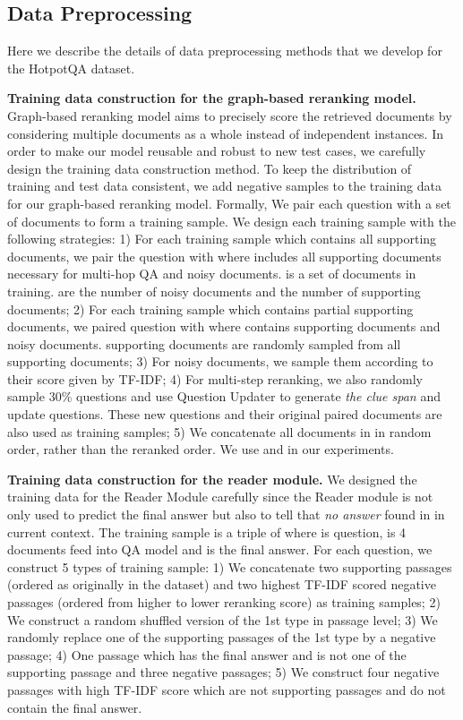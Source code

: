 \documentclass[sigconf]{acmart}
\begin{document}
\subsection{Data Preprocessing}

Here we describe the details of data preprocessing methods that we develop for the HotpotQA dataset.

\BlankLine
\noindent \textbf{Training data construction for the graph-based reranking model.}
Graph-based reranking model aims to precisely score the retrieved documents by considering multiple documents as a whole instead of independent instances. In order to make our model reusable and robust to new test cases, we carefully design the training data construction method. To keep the distribution of training and test data consistent, we add negative samples to the training data for our graph-based reranking model. Formally, We pair each question  with a set of documents  to form a training sample. We design each training sample with the following strategies: 1) For each training sample which contains all supporting documents, we pair the question  with  where  includes all  supporting documents necessary for multi-hop QA and  noisy documents.  is a set of documents in training.  are the number of noisy documents and the number of supporting documents; 2) For each training sample which contains partial supporting documents, we paired question  with  where  contains  supporting documents and  noisy documents. supporting documents are randomly sampled from all supporting documents; 3) For noisy documents, we sample them according to their score given by TF-IDF; 4) For multi-step reranking, we also randomly sample 30\% questions and use Question Updater to generate \textit{the clue span} and update questions. These new questions and their original paired documents are also used as training samples; 5) We concatenate all documents in  in random order, rather than the reranked order. We use  and  in our experiments.


\BlankLine
\noindent \textbf{Training data construction for the reader module.}
We designed the training data for the Reader Module carefully since the Reader module is not only used to predict the final answer but also to tell that \textit{no answer} found in in current context. The training sample is a triple of  where  is question,  is 4 documents feed into QA model and  is the final answer. For each question, we construct 5 types of training sample: 1) We concatenate two supporting passages (ordered as originally in the dataset) and two highest TF-IDF scored negative passages (ordered from higher to lower reranking score) as training samples; 2) We construct a random shuffled version of the 1st type in passage level; 3) We randomly replace one of the supporting passages of the 1st type by a negative passage; 4) One passage which has the final answer and is not one of the supporting passage and three negative passages; 5) We construct four negative passages with high TF-IDF score which are not supporting passages and do not contain the final answer.
\end{document}
